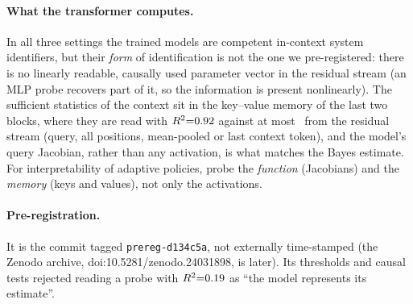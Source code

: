 \paragraph{What the transformer computes.} In all three settings the trained models are competent in-context system
identifiers, but their \emph{form} of identification is not the one we pre-registered: there is no linearly readable,
causally used parameter vector in the residual stream (an MLP probe recovers part of it, so the information is present
nonlinearly). The sufficient statistics of the context sit in the key--value memory of the last two blocks, where they are
read with $R^2{=}0.92$ against at most \AcResBestMom\ from the residual stream (query, all positions, mean-pooled or last context token), and the model's
query Jacobian, rather than any activation, is what matches the Bayes estimate.
For interpretability of adaptive policies, probe the \emph{function} (Jacobians) and the \emph{memory} (keys
and values), not only the activations.

\paragraph{Pre-registration.} It is the commit tagged \texttt{prereg-d134c5a}, not externally time-stamped (the
Zenodo archive, doi:10.5281/zenodo.24031898, is later). Its thresholds and causal tests rejected reading a probe with
$R^2{=}0.19$ as ``the model represents its estimate''.

